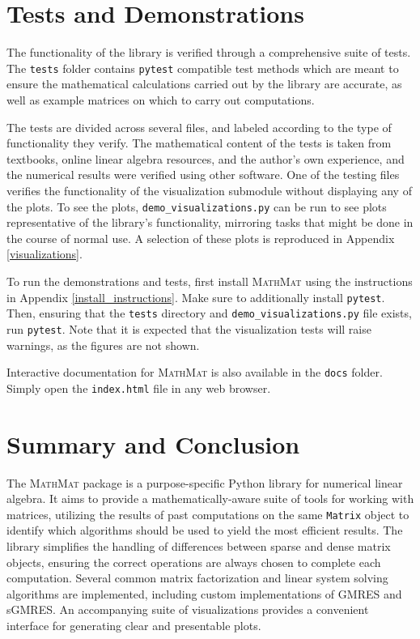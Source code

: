 \documentclass[12pt,a4paper]{article}
\newcommand{\mathmat}{\textsc{MathMat} }
\newcommand{\ct}[1]{\texttt{#1}}
\begin{document}
\section{Tests and Demonstrations}

The functionality of the library is verified through a comprehensive suite of tests. The \ct{tests} folder contains \ct{pytest} \cite{PyTest} compatible test methods which are meant to ensure the mathematical calculations carried out by the library are accurate, as well as example matrices on which to carry out computations.

The tests are divided across several files, and labeled according to the type of functionality they verify. The mathematical content of the tests is taken from textbooks, online linear algebra resources, and the author's own experience, and the numerical results were verified using other software. One of the testing files verifies the functionality of the visualization submodule without displaying any of the plots. To see the plots, \ct{demo\_visualizations.py} can be run to see plots representative of the library's functionality, mirroring tasks that might be done in the course of normal use. A selection of these plots is reproduced in Appendix \ref{visualizations}.

To run the demonstrations and tests, first install \mathmat using the instructions in Appendix \ref{install_instructions}. Make sure to additionally install \ct{pytest}. Then, ensuring that the \ct{tests} directory and \ct{demo\_visualizations.py} file exists, run \ct{pytest}. Note that it is expected that the visualization tests will raise warnings, as the figures are not shown.

Interactive documentation for \mathmat is also available in the \ct{docs} folder. Simply open the \ct{index.html} file in any web browser.

\section{Summary and Conclusion}

The \mathmat package is a purpose-specific Python library for numerical linear algebra. It aims to provide a mathematically-aware suite of tools for working with matrices, utilizing the results of past computations on the same \ct{Matrix} object to identify which algorithms should be used to yield the most efficient results. The library simplifies the handling of differences between sparse and dense matrix objects, ensuring the correct operations are always chosen to complete each computation. Several common matrix factorization and linear system solving algorithms are implemented, including custom implementations of GMRES and sGMRES. An accompanying suite of visualizations provides a convenient interface for generating clear and presentable plots.
\end{document}
